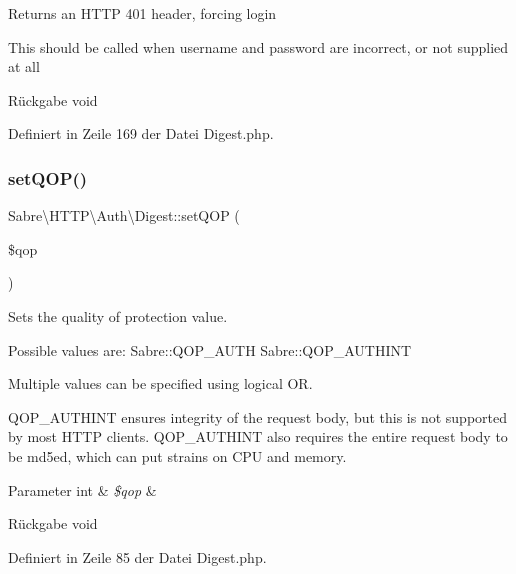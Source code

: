 Returns an H\+T\+TP 401 header, forcing login

This should be called when username and password are incorrect, or not supplied at all

\begin{DoxyReturn}{Rückgabe}
void 
\end{DoxyReturn}


Definiert in Zeile 169 der Datei Digest.\+php.

\mbox{\label{class_sabre_1_1_h_t_t_p_1_1_auth_1_1_digest_a11ee647072118c6062f8f8b59e61f981}} 
\subsubsection{\texorpdfstring{set\+Q\+O\+P()}{setQOP()}}
{\footnotesize\ttfamily Sabre\textbackslash{}\+H\+T\+T\+P\textbackslash{}\+Auth\textbackslash{}\+Digest\+::set\+Q\+OP (\begin{DoxyParamCaption}\item[{}]{\$qop }\end{DoxyParamCaption})}

Sets the quality of protection value.

Possible values are\+: Sabre\+::\+Q\+O\+P\+\_\+\+A\+U\+TH Sabre\+::\+Q\+O\+P\+\_\+\+A\+U\+T\+H\+I\+NT

Multiple values can be specified using logical OR.

Q\+O\+P\+\_\+\+A\+U\+T\+H\+I\+NT ensures integrity of the request body, but this is not supported by most H\+T\+TP clients. Q\+O\+P\+\_\+\+A\+U\+T\+H\+I\+NT also requires the entire request body to be md5\textquotesingle{}ed, which can put strains on C\+PU and memory.


\begin{DoxyParams}[1]{Parameter}
int & {\em \$qop} & \\
\hline
\end{DoxyParams}
\begin{DoxyReturn}{Rückgabe}
void 
\end{DoxyReturn}


Definiert in Zeile 85 der Datei Digest.\+php.

\mbox{\label{class_sabre_1_1_h_t_t_p_1_1_auth_1_1_digest_a178ae979d08871d75cd67b6ad92135c1}} 
